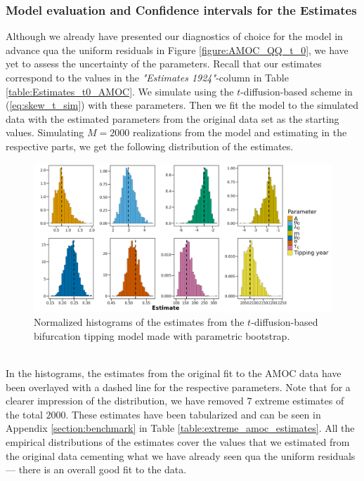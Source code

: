 \subsubsection{Model evaluation and Confidence intervals for the Estimates}
Although we already have presented our diagnostics of choice for the model in advance qua the uniform residuals in Figure \ref{figure:AMOC_QQ_t_0}, we have yet to assess the uncertainty of the parameters. Recall that our estimates correspond to the values in the \textit{"Estimates 1924"}-column in Table \ref{table:Estimates_t0_AMOC}. We simulate using the $t$-diffusion-based scheme in (\ref{eq:skew_t_sim}) with these parameters. Then we fit the model to the simulated data with the estimated parameters from the original data set as the starting values. Simulating $M = 2000$ realizations from the model and estimating in the respective parts, we get the following distribution of the estimates.
\begin{figure}[h!]
    \begin{center}
    \includegraphics[scale = .095]{figures/estim_tibble_plot.jpeg}
    \caption{Normalized histograms of the estimates from the $t$-diffusion-based bifurcation tipping model made with parametric bootstrap.}
    \label{figure:AMOC_parametric_bootstrap}
    \end{center}
\end{figure}\\
In the histograms, the estimates from the original fit to the AMOC data have been overlayed with a dashed line for the respective parameters. Note that for a clearer impression of the distribution, we have removed $7$ extreme estimates of the total $2000$. These estimates have been tabularized and can be seen in Appendix \ref{section:benchmark} in Table \ref{table:extreme_amoc_estimates}. All the empirical distributions of the estimates cover the values that we estimated from the original data cementing what we have already seen qua the uniform residuals — there is an overall good fit to the data.
